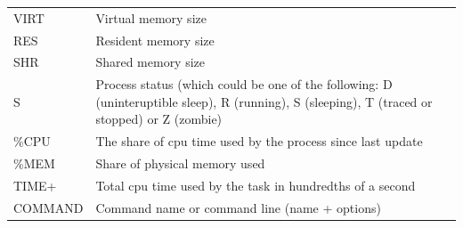 \documentclass[]{book}
\begin{document}
\begin{longtable}[]{@{}ll@{}}
\begin{minipage}[t]{0.05\columnwidth}\raggedright
VIRT\strut
\end{minipage} & \begin{minipage}[t]{0.89\columnwidth}\raggedright
Virtual memory size\strut
\end{minipage}\tabularnewline
\begin{minipage}[t]{0.05\columnwidth}\raggedright
RES\strut
\end{minipage} & \begin{minipage}[t]{0.89\columnwidth}\raggedright
Resident memory size\strut
\end{minipage}\tabularnewline
\begin{minipage}[t]{0.05\columnwidth}\raggedright
SHR\strut
\end{minipage} & \begin{minipage}[t]{0.89\columnwidth}\raggedright
Shared memory size\strut
\end{minipage}\tabularnewline
\begin{minipage}[t]{0.05\columnwidth}\raggedright
S\strut
\end{minipage} & \begin{minipage}[t]{0.89\columnwidth}\raggedright
Process status (which could be one of the following: D (uninteruptible sleep), R (running), S (sleeping), T (traced or stopped) or Z (zombie)\strut
\end{minipage}\tabularnewline
\begin{minipage}[t]{0.05\columnwidth}\raggedright
\%CPU\strut
\end{minipage} & \begin{minipage}[t]{0.89\columnwidth}\raggedright
The share of cpu time used by the process since last update\strut
\end{minipage}\tabularnewline
\begin{minipage}[t]{0.05\columnwidth}\raggedright
\%MEM\strut
\end{minipage} & \begin{minipage}[t]{0.89\columnwidth}\raggedright
Share of physical memory used\strut
\end{minipage}\tabularnewline
\begin{minipage}[t]{0.05\columnwidth}\raggedright
TIME+\strut
\end{minipage} & \begin{minipage}[t]{0.89\columnwidth}\raggedright
Total cpu time used by the task in hundredths of a second\strut
\end{minipage}\tabularnewline
\begin{minipage}[t]{0.05\columnwidth}\raggedright
COMMAND\strut
\end{minipage} & \begin{minipage}[t]{0.89\columnwidth}\raggedright
Command name or command line (name + options)\strut
\end{minipage}\tabularnewline
\bottomrule
\end{longtable}
\end{document}
